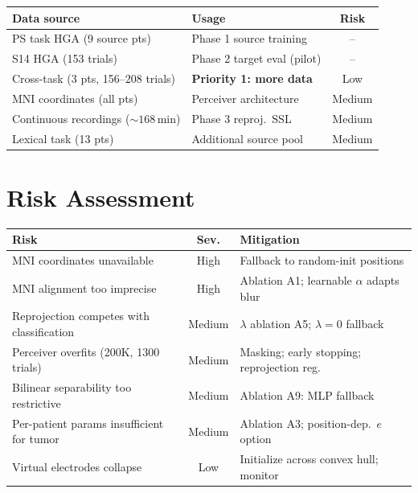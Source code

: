 \documentclass[11pt,letterpaper]{article}
\begin{document}
\begin{table}[ht!]\centering\small
\begin{tabular}{@{}llc@{}}
\toprule
\textbf{Data source} & \textbf{Usage} & \textbf{Risk} \\
\midrule
PS task HGA (9 source pts) & Phase 1 source training & -- \\
S14 HGA (153 trials) & Phase 2 target eval (pilot) & -- \\
Cross-task (3 pts, 156--208 trials) & \textbf{Priority 1: more data} & Low \\
MNI coordinates (all pts) & Perceiver architecture & Medium \\
Continuous recordings (${\sim}168$\,min) & Phase 3 reproj.\ SSL & Medium \\
Lexical task (13 pts) & Additional source pool & Medium \\
\bottomrule
\end{tabular}
\end{table}


\section{Risk Assessment}

\begin{table}[ht!]\centering\small
\begin{tabular}{@{}p{}cp{}@{}}
\toprule
\textbf{Risk} & \textbf{Sev.} & \textbf{Mitigation} \\
\midrule
MNI coordinates unavailable & High & Fallback to random-init positions \\
MNI alignment too imprecise & High & Ablation A1; learnable $\alpha$ adapts blur \\
Reprojection competes with classification & Medium & $\lambda$ ablation A5; $\lambda{=}0$ fallback \\
Perceiver overfits (200K, 1300 trials) & Medium & Masking; early stopping; reprojection reg. \\
Bilinear separability too restrictive & Medium & Ablation A9: MLP fallback \\
Per-patient params insufficient for tumor & Medium & Ablation A3; position-dep.\ $e$ option \\
Virtual electrodes collapse & Low & Initialize across convex hull; monitor \\
\bottomrule
\end{tabular}
\end{table}
\end{document}
